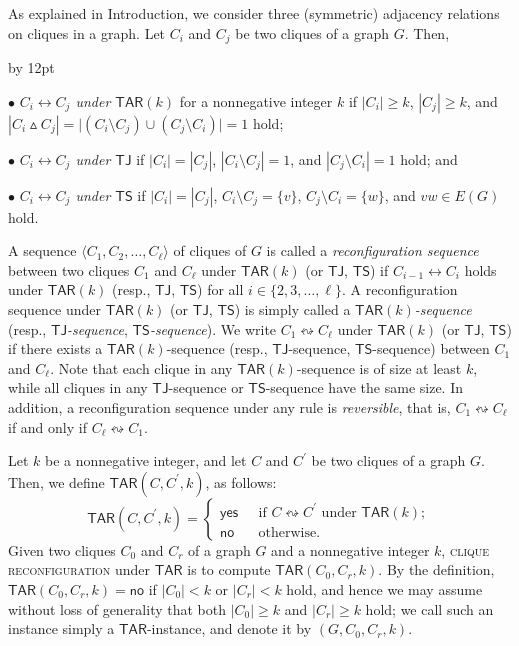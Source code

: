 \documentclass{llncs}
\newcommand{\onestep}{\leftrightarrow}
\newcommand{\sevstep}{\leftrightsquigarrow}
\newcommand{\TAR}[1]{\mathsf{TAR}(#1)}
\newcommand{\TS}{\mathsf{TS}}
\newcommand{\TJ}{\mathsf{TJ}}
\newcommand{\ini}{0}
\newcommand{\tar}{r}
\newcommand{\cliq}{C}
\newcommand{\TARrule}{\mathsf{TAR}}
\newcommand{\YES}{\mathsf{yes}}
\newcommand{\NO}{\mathsf{no}}
\newcommand{\TARins}[3]{\mathsf{TAR}(#1,#2,#3)}
\newenvironment{listing}[1]{\begin{list}{*}{\settowidth{\labelwidth}{#1}\setlength{\leftmargin}{\labelwidth}\advance \leftmargin by 12pt
\setlength{\itemsep}{0pt}\setlength{\parsep}{0pt}\setlength{\topsep}{0pt}\setlength{\parskip}{0pt}}}{\end{list}}
\newcounter{one}
\newcounter{two}
\newcounter{three}
\begin{document}
	As explained in Introduction, we consider three (symmetric) adjacency relations on cliques in a graph.
	Let $\cliq_i$ and $\cliq_j$ be two cliques of a graph $G$.
	Then,
	\begin{listing}{a}
	\item[$\bullet$] \emph{$\cliq_i \onestep \cliq_j$ under $\TAR{k}$} for a nonnegative integer $k$ if $|\cliq_i| \ge k$, $|\cliq_j| \ge k$, and $|\cliq_i \vartriangle \cliq_j| = \bigl|(\cliq_i \setminus \cliq_j) \cup (\cliq_j \setminus \cliq_i) \bigr| = 1$ hold;
	\smallskip

	\item[$\bullet$] \emph{$\cliq_i \onestep \cliq_j$ under $\TJ$} if $|\cliq_i| = |\cliq_j|$, $|\cliq_i \setminus \cliq_j| = 1$, and $|\cliq_j \setminus \cliq_i| = 1$ hold; and
	\smallskip

	\item[$\bullet$] \emph{$\cliq_i \onestep \cliq_j$ under $\TS$} if $|\cliq_i| = |\cliq_j|$, $\cliq_i \setminus \cliq_j = \{v\}$, $\cliq_j \setminus \cliq_i = \{w\}$, and $vw \in E(G)$ hold.
	\smallskip
	\end{listing}
	A sequence $\langle \cliq_1, \cliq_2, \ldots, \cliq_{\ell} \rangle$ of cliques of $G$ is called a {\em reconfiguration sequence} between two cliques $\cliq_1$ and $\cliq_{\ell}$ under $\TAR{k}$ (or $\TJ$, $\TS$) if $\cliq_{i-1} \onestep \cliq_i$ holds under $\TAR{k}$ (resp., $\TJ$, $\TS$) for all $i \in \{2, 3, \ldots, \ell\}$.
	A reconfiguration sequence under $\TAR{k}$ (or $\TJ$, $\TS$) is simply called a \emph{$\TAR{k}$-sequence} (resp., \emph{$\TJ$-sequence}, \emph{$\TS$-sequence}).
	We write $\cliq_{1} \sevstep \cliq_{\ell}$ under $\TAR{k}$ (or $\TJ$, $\TS$) if there exists a $\TAR{k}$-sequence (resp., $\TJ$-sequence, $\TS$-sequence) between $\cliq_1$ and $\cliq_{\ell}$.
	Note that each clique in any $\TAR{k}$-sequence is of size at least $k$, while all cliques in any $\TJ$-sequence or $\TS$-sequence have the same size.
	In addition, a reconfiguration sequence under any rule is {\em reversible}, that is, $\cliq_{1} \sevstep \cliq_{\ell}$ if and only if $\cliq_{\ell} \sevstep \cliq_{1}$.

	Let $k$ be a nonnegative integer, and let $\cliq$ and $\cliq^\prime$ be two cliques of a graph $G$.
	Then, we define $\TARins{\cliq}{\cliq^\prime}{k}$, as follows:
	\[
		\TARins{\cliq}{\cliq^\prime}{k} = \left\{
				\begin{array}{ll}
				\YES & ~~~\mbox{if $\cliq \sevstep \cliq^\prime$ under $\TAR{k}$}; \\
				\NO  & ~~~\mbox{otherwise}.
				\end{array} \right.
	\]
	Given two cliques $\cliq_{\ini}$ and $\cliq_{\tar}$ of a graph $G$ and a nonnegative integer $k$, \textsc{clique reconfiguration} under $\TARrule$ is to compute $\TARins{\cliq_{\ini}}{\cliq_{\tar}}{k}$.
	By the definition, $\TARins{\cliq_{\ini}}{\cliq_{\tar}}{k} = \NO$ if $|\cliq_{\ini}| < k$ or $|\cliq_{\tar}| <k$ hold, and hence we may assume without loss of generality that both $|\cliq_{\ini}| \ge k$ and $|\cliq_{\tar}| \ge k$ hold;
we call such an instance simply a $\TARrule$-instance, and denote it by $(G, \cliq_{\ini}, \cliq_{\tar}, k)$.
	
\end{document}
